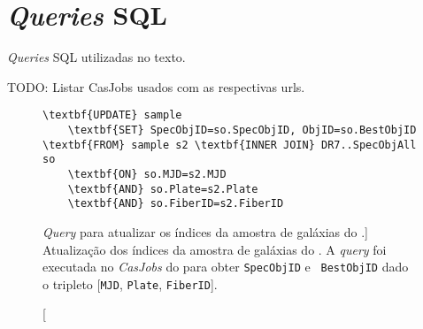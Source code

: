 



\chapter{{\em Queries} SQL}
\label{apendice:Queries}

{\em Queries} SQL utilizadas no texto. 

TODO: Listar CasJobs usados com as respectivas urls.

\begin{figure}
\begin{Verbatim}[commandchars=\\\{\}]
\textbf{UPDATE} sample
	\textbf{SET} SpecObjID=so.SpecObjID, ObjID=so.BestObjID
\textbf{FROM} sample s2 \textbf{INNER JOIN} DR7..SpecObjAll so
	\textbf{ON} so.MJD=s2.MJD
	\textbf{AND} so.Plate=s2.Plate
	\textbf{AND} so.FiberID=s2.FiberID
\end{Verbatim}
	\caption
	[{\em Query} para atualizar os índices da amostra de galáxias do
	\starlight.]
	{Atualização dos índices da amostra de galáxias do \starlight. A {\em query}
	foi executada no {\em CasJobs} do \SDSS para obter {\tt SpecObjID} e {\tt
	BestObjID} dado o tripleto [{\tt MJD}, {\tt Plate}, {\tt FiberID}].}
	\label{fig:QueryAtualizaObjIds}
\end{figure}


